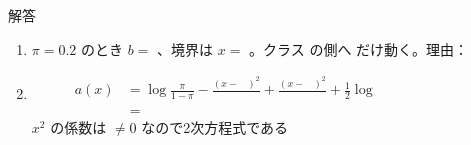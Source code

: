 \documentclass[a4paper,dvipdfmx]{jsarticle}
\newcommand{\提出期限}{2026年11月16日（月）}
\newcommand{\学籍番号}{0000000}
\newcommand{\氏名}{氏名を書く}
\newcommand{\提出日}{2026年11月16日}
\newenvironment{answer}{\begin{itembox}[l]{解答}}{\end{itembox}}
\begin{document}
\begin{enumerate}
\begin{answer}
\begin{enumerate}
          $\pi = 0.5$ のとき $a(x) = 0 \iff x = $ \phantom{XXXX}
          \vspace{4mm}
        \item $\pi = 0.2$ のとき $b = $ \phantom{XXXXXXXX}、境界は $x = $ \phantom{XXXX}。クラス \phantom{X} の側へ \phantom{XXXX} だけ動く。理由：
          \vspace{10mm}
        \item
          \begin{align*}
            a(x) &= \log\frac{\pi}{1 - \pi} - \frac{(x - \phantom{X})^2}{\phantom{XX}} + \frac{(x - \phantom{X})^2}{\phantom{XX}} + \frac{1}{2}\log\phantom{XXXX} \\
            &= \phantom{XXXXXXXXXXXXXXXXXXXXXXXXXXXX}
          \end{align*}
          $x^2$ の係数は \phantom{XXXX} $\neq 0$ なので2次方程式である
          \vspace{2mm}
      \end{enumerate}
    \end{answer}


\end{enumerate}
\end{document}
